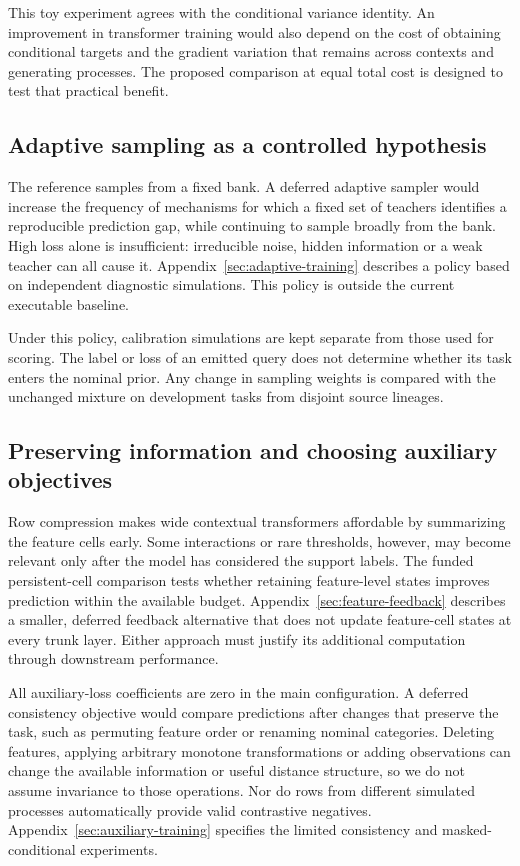 \documentclass[11pt]{article}
\begin{document}
This toy experiment agrees with the conditional variance identity. An improvement in transformer training would also depend on the cost of obtaining conditional targets and the gradient variation that remains across contexts and generating processes. The proposed comparison at equal total cost is designed to test that practical benefit.

\subsection{Adaptive sampling as a controlled hypothesis}

The reference samples from a fixed bank. A deferred adaptive sampler would increase the frequency of mechanisms for which a fixed set of teachers identifies a reproducible prediction gap, while continuing to sample broadly from the bank. High loss alone is insufficient: irreducible noise, hidden information or a weak teacher can all cause it. Appendix~\ref{sec:adaptive-training} describes a policy based on independent diagnostic simulations. This policy is outside the current executable baseline.

Under this policy, calibration simulations are kept separate from those used for scoring. The label or loss of an emitted query does not determine whether its task enters the nominal prior. Any change in sampling weights is compared with the unchanged mixture on development tasks from disjoint source lineages.

\subsection{Preserving information and choosing auxiliary objectives}

Row compression makes wide contextual transformers affordable by summarizing the feature cells early. Some interactions or rare thresholds, however, may become relevant only after the model has considered the support labels. The funded persistent-cell comparison tests whether retaining feature-level states improves prediction within the available budget. Appendix~\ref{sec:feature-feedback} describes a smaller, deferred feedback alternative that does not update feature-cell states at every trunk layer. Either approach must justify its additional computation through downstream performance.

All auxiliary-loss coefficients are zero in the main configuration. A deferred consistency objective would compare predictions after changes that preserve the task, such as permuting feature order or renaming nominal categories. Deleting features, applying arbitrary monotone transformations or adding observations can change the available information or useful distance structure, so we do not assume invariance to those operations. Nor do rows from different simulated processes automatically provide valid contrastive negatives. Appendix~\ref{sec:auxiliary-training} specifies the limited consistency and masked-conditional experiments.
\end{document}
